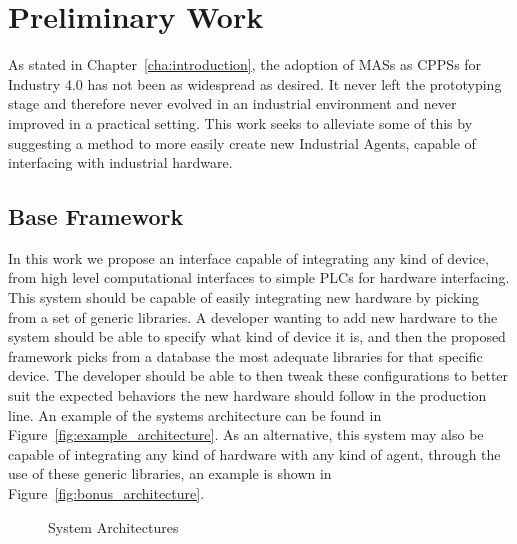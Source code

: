 

\glsresetall

\chapter{Preliminary Work}
\label{cha:preliminary_work}

As stated in Chapter~\ref{cha:introduction}, the adoption of \gls{MAS}s as \gls{CPPS}s for Industry 4.0 has not been as widespread as desired. It never left the prototyping stage and therefore never evolved in an industrial environment and never improved in a practical setting. This work seeks to alleviate some of this by suggesting a method to more easily create new Industrial Agents, capable of interfacing with industrial hardware.

\section{Base Framework}
\label{sec:base_framework}

In this work we propose an interface capable of integrating any kind of device, from high level computational interfaces to simple \gls{PLC}s for hardware interfacing. This system should be capable of easily integrating new hardware by picking from a set of generic libraries. A developer wanting to add new hardware to the system should be able to specify what kind of device it is, and then the proposed framework picks from a database the most adequate libraries for that specific device. The developer should be able to then tweak these configurations to better suit the expected behaviors the new hardware should follow in the production line. An example of the systems architecture can be found in Figure~\ref{fig:example_architecture}. As an alternative, this system may also be capable of integrating any kind of hardware with any kind of agent, through the use of these generic libraries, an example is shown in Figure~\ref{fig:bonus_architecture}.\\

\begin{figure}[h!]
	\centering
	\caption{System Architectures}
	\label{fig:system_architectures}
\end{figure}

